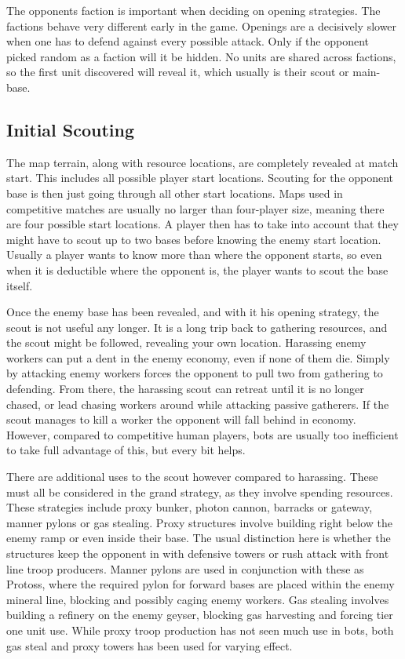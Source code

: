 The opponents faction is important when deciding on opening strategies. The factions behave very different early in the game. Openings are a decisively slower when one has to defend against every possible attack. Only if the opponent picked random as a faction will it be hidden. No units are shared across factions, so the first unit discovered will reveal it, which usually is their scout or main-base.

	\subsection*{Initial Scouting}
	The map terrain, along with resource locations, are completely revealed at match start. This includes all possible player start locations. Scouting for the opponent base is then just going through all other start locations. Maps used in competitive matches are usually no larger than four-player size, meaning there are four possible start locations. A player then has to take into account that they might have to scout up to two bases before knowing the enemy start location. Usually a player wants to know more than where the opponent starts, so even when it is deductible where the opponent is, the player wants to scout the base itself.
	
	Once the enemy base has been revealed, and with it his opening strategy, the scout is not useful any longer. It is a long trip back to gathering resources, and the scout might be followed, revealing your own location. Harassing enemy workers can put a dent in the enemy economy, even if none of them die. Simply by attacking enemy workers forces the opponent to pull two from gathering to defending. From there, the harassing scout can retreat until it is no longer chased, or lead chasing workers around while attacking passive gatherers. If the scout manages to kill a worker the opponent will fall behind in economy. However, compared to competitive human players, bots are usually too inefficient to take full advantage of this, but every bit helps.
	
	There are additional uses to the scout however compared to harassing. These must all be considered in the grand strategy, as they involve spending resources. These strategies include proxy bunker, photon cannon, barracks or gateway, manner pylons or gas stealing. Proxy structures involve building right below the enemy ramp or even inside their base. The usual distinction here is whether the structures keep the opponent in with defensive towers or rush attack with front line troop producers. Manner pylons are used in conjunction with these as Protoss, where the required pylon for forward bases are placed within the enemy mineral line, blocking and possibly caging enemy workers. Gas stealing involves building a refinery on the enemy geyser, blocking gas harvesting and forcing tier one unit use. While proxy troop production has not seen much use in bots, both gas steal and proxy towers has been used for varying effect.
	
